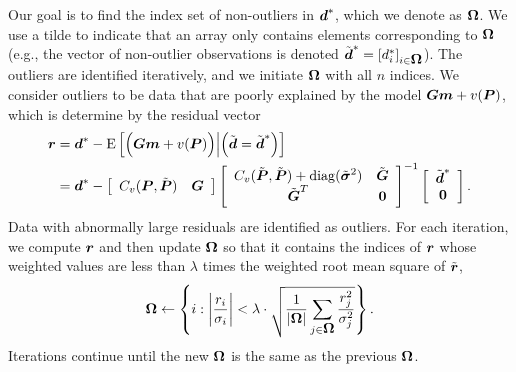\documentclass[extra,mreferee]{gji}
\begin{document}
Our goal is to find the index set of non-outliers in $\data^*$, which
we denote as $\mitbf{\Omega}$. We use a tilde to indicate that an
array only contains elements corresponding to $\mitbf{\Omega}$ (e.g.,
the vector of non-outlier observations is denoted $\tilde{\data}^* =
[d_i^*]_{i \in \mitbf{\Omega}}$). The outliers are identified
iteratively, and we initiate $\mitbf{\Omega}$ with all $n$ indices. We
consider outliers to be data that are poorly explained by the model
$\G\mitbf{m} + v(\points)$, which is determine by the residual vector
\begin{align}\label{eq:Residual} 
\mitbf{r} &= \data^* - \E{\Big(\G\mitbf{m} + v(\points)\Big) \Big| \Big(\tilde{\data} =
                                                                        \tilde{\data}^*\Big)} \\
          &= \data^*  - 
            \left[\begin{array}{cc}
                  C_v(\points,\tilde{\points}) & \G \nonumber \\
                  \end{array}\right]
            \left[\begin{array}{cc}
                  C_v(\tilde{\points},\tilde{\points}) + \mathrm{diag}(\tilde{\mitbf{\sigma}}^2) & \tilde{\G} \\
                  \tilde{\G}^T  & \zeros \\
                  \end{array}\right]^{-1}
            \left[\begin{array}{c}
                  \tilde{\data}^* \\
                  \zeros \\
                  \end{array}\right].
\end{align}
Data with abnormally large residuals are identified as outliers. For
each iteration, we compute $\mitbf{r}$ and then update
$\mitbf{\Omega}$ so that it contains the indices of $\mitbf{r}$ whose
weighted values are less than $\lambda$ times the weighted root mean
square of $\tilde{\mitbf{r}}$,
\begin{equation}\label{eq:Update}
\mitbf{\Omega} \leftarrow \left\{i : \left|\frac{r_i}{\sigma_i}\right| < \lambda \cdot \sqrt{\frac{1}{|\mitbf{\Omega}|} \sum_{j \in \mitbf{\Omega}} \frac{r_j^2}{\sigma_j^2}} \right\}.
\end{equation} 
Iterations continue until the new $\mitbf{\Omega}$ is the same as the
previous $\mitbf{\Omega}$.
\end{document}
